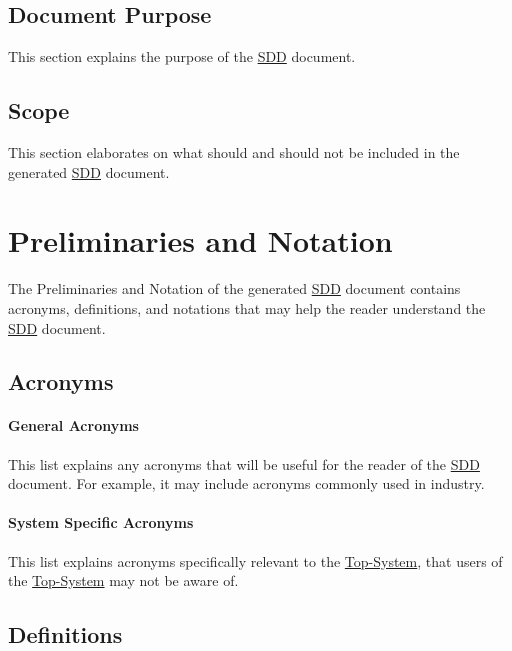 \documentclass{mcscert}
\newcommand{\topsystemnolink}{Top-System} %
\newcommand{\topsystem}{\hyperref[def:topsystem]{\topsystemnolink{}}}
\newcommand{\gloss}{Preliminaries and Notation} %
\begin{document}
	\subsection{Document Purpose}
	\label{ssec:doc-purpose-description}
	This section explains the purpose of the \hyperref[acr:sdd]{SDD} document.
    
	\subsection{Scope}
	\label{ssec:scope-description}
	This section elaborates on what should and should not be included in the generated \hyperref[acr:sdd]{SDD} document. 

\section{\gloss{}}
\label{sec:not-and-prelim}
The \gloss{} of the generated \hyperref[acr:sdd]{SDD} document contains acronyms, definitions, and notations that may help the reader understand the \hyperref[acr:sdd]{SDD} document.
  
\subsection{Acronyms} \label{ssec:acr-description}

\paragraph*{General Acronyms}
\label{par:acr-gen-description}
This list explains any acronyms that will be useful for the reader of the \hyperref[acr:sdd]{SDD} document. 
For example, it may include acronyms commonly used in industry.
      
\paragraph*{System Specific Acronyms}
\label{par:acr-sys-spec-description}
This list\label{itm:sys-acrs} explains acronyms specifically relevant to the \topsystem{}, that users of the \topsystem{} may not be aware of.

\subsection{Definitions}
\label{ssec:def-description}
\end{document}
